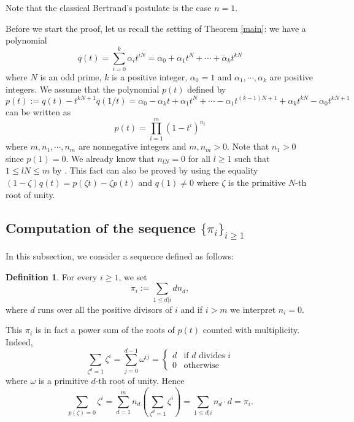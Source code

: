 \documentclass[reqno]{amsart}
\numberwithin{equation}{section}
\theoremstyle{plain}
\theoremstyle{definition}
\newtheorem{de}[equation]{Definition}
\begin{document}
Note that the classical Bertrand's postulate is the case $n=1$.

Before we start the proof, let us recall the setting of Theorem \ref{main}: we have a polynomial
$$q(t)=\sum^k_{i=0}\alpha_it^{iN}=\alpha_0+\alpha_1t^N+\cdots+\alpha_kt^{kN}$$
where $N$ is an odd prime, $k$ is a positive integer, $\alpha_0=1$ and $\alpha_1,\cdots,\alpha_k$ are positive integers. We assume that the polynomial $p(t)$ defined by
$$p(t):=q(t)-t^{kN+1}q(1/t)=\alpha_0-\alpha_kt+\alpha_1t^N+\cdots-\alpha_1t^{(k-1)N+1}+\alpha_kt^{kN}-\alpha_0t^{kN+1}$$
can be written as 
$$p(t)=\prod^m_{i=1}(1-t^i)^{n_i}$$
where $m, n_1, \cdots, n_m$ are nonnegative integers and $m, n_m>0$. Note that $n_1>0$ since $p(1)=0$. We already know that $n_{lN}=0$ for all $l\geq 1$ such that $1\leq lN\leq m$ by \cite[Proposition 3.3]{Kabbaj}. This fact can also be proved by using the equality $(1-\zeta)q(t)=p(\zeta t)-\zeta p(t)$ and $q(1)\neq0$ where $\zeta$ is the primitive $N$-th root of unity. %



\subsection{Computation of the sequence $\{\pi_i\}_{i\geq1}$}

In this subsection, we consider a sequence defined as follows:

\begin{de}\label{piseq}
For every $i\geq 1$, we set
$$\pi_i:=\sum_{1\leq d|i}dn_d,$$
where $d$ runs over all the positive divisors of $i$ and if $i>m$ we interpret $n_i=0$. 
\end{de}

This $\pi_i$ is in fact a power sum of the roots of $p(t)$ counted with multiplicity. Indeed,
$$\sum_{\zeta^d=1}\zeta^i=\sum^{d-1}_{j=0}\omega^{ij}=\left\{\begin{array}{llll}
d & \text{if $d$ divides $i$}\\
0 & \text{otherwise}
\end{array}\right.$$
where $\omega$ is a primitive $d$-th root of unity. Hence
$$\sum_{p(\zeta)=0}\zeta^i=\sum^m_{d=1}n_d\left(\sum_{\zeta^d=1}\zeta^i\right)=\sum_{1\leq d|i}n_d\cdot d=\pi_i.$$
\end{document}
